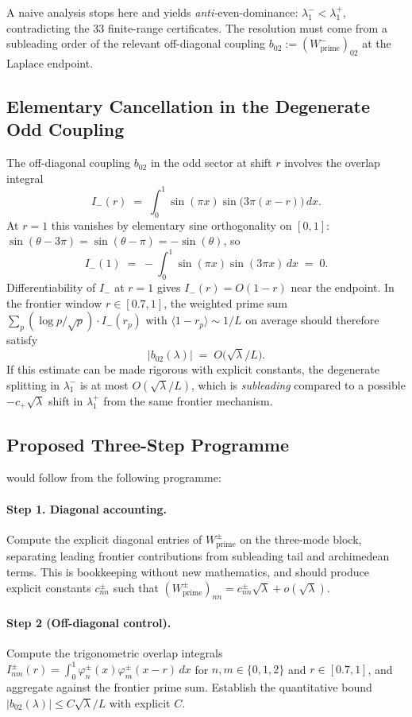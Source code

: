 \documentclass[11pt,a4paper]{article}
\theoremstyle{remark}
\theoremstyle{plain}
\begin{document}
A naive analysis stops here and yields \emph{anti-}even-dominance:
$\lambda_1^-<\lambda_1^+$, contradicting the 33 finite-range certificates. The
resolution must come from a subleading order of the relevant off-diagonal
coupling $b_{02}:=(W^-_{\mathrm{prime}})_{02}$ at the Laplace endpoint.

\subsection{Elementary Cancellation in the Degenerate Odd Coupling}

The off-diagonal coupling $b_{02}$ in the odd sector at shift $r$ involves
the overlap integral
\[
  I_-(r) \;=\; \int_0^1 \sin(\pi x)\sin\bigl(3\pi(x-r)\bigr)\,dx.
\]
At $r=1$ this vanishes by elementary sine orthogonality on $[0,1]$:
$\sin(\theta-3\pi)=\sin(\theta-\pi)=-\sin(\theta)$, so
\[
  I_-(1) \;=\; -\int_0^1 \sin(\pi x)\sin(3\pi x)\,dx \;=\; 0.
\]
Differentiability of $I_-$ at $r=1$ gives $I_-(r)=O(1-r)$ near the endpoint.
In the frontier window $r\in[0.7,1]$, the weighted prime sum
$\sum_p (\log p/\sqrt p)\cdot I_-(r_p)$ with $\langle 1-r_p\rangle\sim 1/L$
on average should therefore satisfy
\[
  \bigl|b_{02}(\lambda)\bigr| \;=\; O\bigl(\sqrt\lambda/L\bigr).
\]
If this estimate can be made rigorous with explicit constants, the degenerate
splitting in $\lambda_1^-$ is at most $O(\sqrt\lambda/L)$, which is
\emph{subleading} compared to a possible $-c_+\sqrt\lambda$ shift in
$\lambda_1^+$ from the same frontier mechanism.

\subsection{Proposed Three-Step Programme}

 would follow from the following programme:

\paragraph{Step 1. Diagonal accounting.}
Compute the explicit diagonal entries of $W^\pm_{\mathrm{prime}}$ on the three-mode block, separating leading
frontier contributions from subleading tail and archimedean terms. This is
bookkeeping without new mathematics, and should produce explicit constants
$c^\pm_{nn}$ such that $(W^\pm_{\mathrm{prime}})_{nn}=c^\pm_{nn}\sqrt\lambda+o(\sqrt\lambda)$.

\paragraph{Step 2 (Off-diagonal control).} Compute the trigonometric overlap
integrals $I_{nm}^\pm(r)=\int_0^1 \varphi_n^\pm(x)\varphi_m^\pm(x-r)\,dx$ for
$n,m\in\{0,1,2\}$ and $r\in[0.7,1]$, and aggregate against the frontier prime
sum. Establish the quantitative bound
$|b_{02}(\lambda)|\leq C\sqrt\lambda/L$ with explicit $C$.
\end{document}
